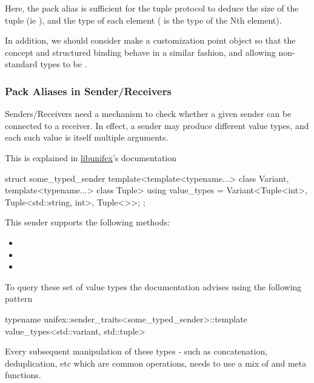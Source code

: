 \documentclass{wg21}
\begin{document}
Here, the  pack alias is sufficient for the tuple protocol to deduce the size
of the tuple (ie ), and the type of each element ( is the type of the Nth element).

In addition, we should consider make  a customization point object so that the  concept and structured binding
behave in a similar fashion, and allowing non-standard types to be .

\subsubsection{Pack Aliases in Sender/Receivers}

Senders/Receivers  need a mechanism to check whether a given sender can be connected to a receiver.
In effect, a sender may produce different value types, and each such value is itself multiple arguments.

This is explained in \href{https://github.com/facebookexperimental/libunifex/blob/main/doc/concepts.md}{libunifex}'s documentation

\begin{colorblock}
    struct some_typed_sender {
        template<template<typename...> class Variant, template<typename...> class Tuple>
        using value_types = Variant<Tuple<int>,
        Tuple<std::string, int>,
        Tuple<>>;
    };
\end{colorblock}
This sender supports the following methods:
\begin{itemize}
    \item {}
    \item {}
    \item {}
\end{itemize}
To query these set of value types the documentation advises using the following pattern

\begin{colorblock}
    typename unifex::sender_traits<some_typed_sender>::template value_types<std::variant, std::tuple>
\end{colorblock}

Every subsequent manipulation of these types - such as concatenation, deduplication, etc which are common operations, needs to use a mix of  and  meta functions.
\end{document}
